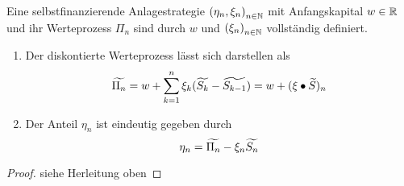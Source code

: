 \begin{lemma} %
	Eine selbstfinanzierende Anlagestrategie $\left( \eta_n, \xi_n \right)_{n \in \mathbb{N}}$ mit Anfangskapital $w \in \mathbb{R}$ und ihr Werteprozess $\Pi_n$ sind durch $w$ und $\left( \xi_n \right)_{n \in \mathbb{N}}$ vollständig definiert. 
	\begin{enumerate}[label=(\alph*), leftmargin=*, nolistsep, topsep=-\parskip]
		\item Der diskontierte Werteprozess lässt sich darstellen als
		\begin{equation*}
		\widetilde{\Pi_n} = w + \sum_{k=1}^n \xi_k (\widetilde{S_k} - \widetilde{S_{k-1}}) = w + (\xi \bullet \widetilde{S})_n
		\end{equation*}
		\item Der Anteil $\eta_n$ ist eindeutig gegeben durch
		\begin{equation*}
		\eta_n = \widetilde{\Pi_n} - \xi_n \widetilde{S_n}
		\end{equation*}
	\end{enumerate}
\end{lemma}
\begin{proof}
	siehe Herleitung oben
\end{proof}
